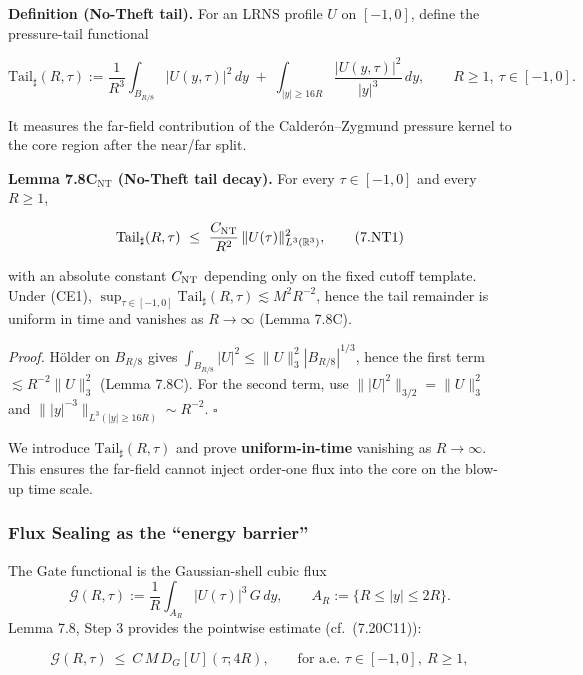 \documentclass[
  11pt,
]{article}
\begin{document}
\textbf{Definition (No-Theft tail).} For an LRNS profile \(U\) on \([-1,0]\), define the pressure-tail functional

\begin{equation}
\mathrm{Tail}_\sharp(R,\tau):=
\frac{1}{R^3}\int_{B_{R/8}}|U(y,\tau)|^2\,dy
\;+\;
\int_{|y|\ge 16R}\frac{|U(y,\tau)|^2}{|y|^3}\,dy,
\qquad R\ge 1,\ \tau\in[-1,0].
\tag{7.NT0}\label{eq:7NT0_tail_def}
\end{equation}

It measures the far-field contribution of the Calderón--Zygmund pressure kernel to the core region after the near/far split.

\textbf{Lemma 7.8C\(_{\mathrm{NT}}\) (No-Theft tail decay).} For every \(\tau\in[-1,0]\) and every \(R\ge 1\),

\begin{equation}
\mathrm{Tail}_\sharp(R,\tau)\ \le\ \frac{C_{\rm NT}}{R^2}\,\|U(\tau)\|_{L^3(\mathbb R^3)}^2,
\tag{7.NT1}\label{eq:7NT1_tail_decay}
\end{equation}

with an absolute constant \(C_{\rm NT}\) depending only on the fixed cutoff template. Under (CE1), \(\sup_{\tau\in[-1,0]}\mathrm{Tail}_\sharp(R,\tau)\lesssim M^2R^{-2}\), hence the tail remainder is uniform in time and vanishes as \(R\to\infty\) (Lemma 7.8C).

\emph{Proof.} Hölder on \(B_{R/8}\) gives \(\int_{B_{R/8}}|U|^2\le \|U\|_3^2|B_{R/8}|^{1/3}\), hence the first term \(\lesssim R^{-2}\|U\|_3^2\) (Lemma 7.8C). For the second term, use \(\||U|^2\|_{3/2}=\|U\|_3^2\) and \(\||y|^{-3}\|_{L^3(|y|\ge 16R)}\sim R^{-2}\). \(\square\)

We introduce \(\mathrm{Tail}_\sharp(R,\tau)\) and prove \textbf{uniform-in-time} vanishing as \(R\to\infty\). This ensures the far-field cannot inject order-one flux into the core on the blow-up time scale.

\hypertarget{flux-sealing-as-the-energy-barrier}{%
\subsubsection{Flux Sealing as the ``energy barrier''}\label{flux-sealing-as-the-energy-barrier}}

The Gate functional is the Gaussian-shell cubic flux \[
\mathcal G(R,\tau):=\frac{1}{R}\int_{A_R}|U(\tau)|^3\,G\,dy,
\qquad A_R:=\{R\le|y|\le 2R\}.
\] Lemma 7.8, Step 3 provides the pointwise estimate (cf.~(7.20C11)):

\begin{equation}
\mathcal G(R,\tau)\ \le\ C\,M\,D_G[U](\tau;4R),
\qquad \text{for a.e. }\tau\in[-1,0],\ R\ge 1,
\tag{7.G1}
\end{equation}
\end{document}
